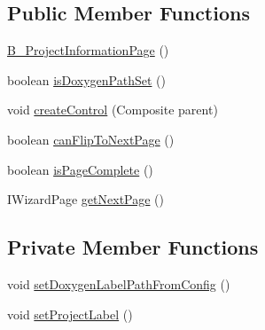 \subsection*{Public Member Functions}
\begin{DoxyCompactItemize}
\item 
\hyperlink{classit_1_1isislab_1_1masonhelperdocumentation_1_1mason_1_1wizards_1_1_b___project_information_page_a78007aec142d1094d5954cd3f6ee4f4e}{B\-\_\-\-Project\-Information\-Page} ()
\item 
boolean \hyperlink{classit_1_1isislab_1_1masonhelperdocumentation_1_1mason_1_1wizards_1_1_b___project_information_page_a0eec0bf0cf4211e377555c20f52abdb8}{is\-Doxygen\-Path\-Set} ()
\item 
void \hyperlink{classit_1_1isislab_1_1masonhelperdocumentation_1_1mason_1_1wizards_1_1_b___project_information_page_abca74e3315d231866ce8a6a016dffaa5}{create\-Control} (Composite parent)
\item 
boolean \hyperlink{classit_1_1isislab_1_1masonhelperdocumentation_1_1mason_1_1wizards_1_1_b___project_information_page_af534554cbdceb3c61b1f48b5df4e290c}{can\-Flip\-To\-Next\-Page} ()
\item 
boolean \hyperlink{classit_1_1isislab_1_1masonhelperdocumentation_1_1mason_1_1wizards_1_1_b___project_information_page_a27830e10567ec9e8c2e855b80f07f5ad}{is\-Page\-Complete} ()
\item 
I\-Wizard\-Page \hyperlink{classit_1_1isislab_1_1masonhelperdocumentation_1_1mason_1_1wizards_1_1_b___project_information_page_ac7752ebb107ca9c3a83640a09edce745}{get\-Next\-Page} ()
\end{DoxyCompactItemize}
\subsection*{Private Member Functions}
\begin{DoxyCompactItemize}
\item 
void \hyperlink{classit_1_1isislab_1_1masonhelperdocumentation_1_1mason_1_1wizards_1_1_b___project_information_page_a787830581d3746b970cde68fec9d59b3}{set\-Doxygen\-Label\-Path\-From\-Config} ()
\item 
void \hyperlink{classit_1_1isislab_1_1masonhelperdocumentation_1_1mason_1_1wizards_1_1_b___project_information_page_afa7497cd5a5b4b3c5fb7f7f1397ebb72}{set\-Project\-Label} ()
\end{DoxyCompactItemize}

